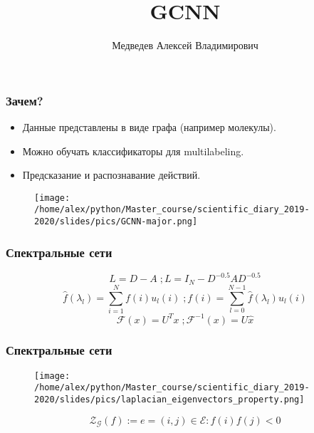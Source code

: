 \documentclass[fleqn, xcolor=x11names]{beamer}
\title{GCNN}
\author[Медведев~Д.\,В.]{Медведев Алексей Владимирович}
\institute[ВМК МГУ]{МГУ имени М. В. Ломоносова,
факультет ВМК, кафедра ММП}
\date{}
\begin{document}
\begin{frame}
\maketitle
\end{frame}

\begin{frame}[fragile]\frametitle{Зачем?}
\begin{block}{}
\begin{itemize}

\item Данные представлены в виде графа (например молекулы).

\item Можно обучать классификаторы для multilabeling.

\item Предсказание и распознавание действий.
\end{itemize}
\end{block}

\begin{figure}[h]
\begin{center}
\texttt{[image: /home/alex/python/Master\_course/scientific\_diary\_2019-2020/slides/pics/GCNN-major.png]}
\end{center}
\end{figure}

\end{frame}

\begin{frame}\frametitle{Спектральные сети}

$$L = D-A\;; L = I_N-D^{-0.5}AD^{-0.5}$$
$$\hat{f}(\lambda_l) = \sum \limits_{i=1}^{N} f(i)u_l(i)\;;f(i)= \sum \limits_{l=0}^{N-1} \hat{f}(\lambda_l)u_l(i)$$
$$\mathcal{F}(x)=U^Tx\;;\mathcal{F}^{-1}(x)=U\hat{x}$$

\end{frame}


\begin{frame}\frametitle{Спектральные сети}

\begin{figure}[h]
\begin{center}
\texttt{[image: /home/alex/python/Master\_course/scientific\_diary\_2019-2020/slides/pics/laplacian\_eigenvectors\_property.png]}
\end{center}
\end{figure}

$$ \mathcal{Z}_{\mathcal{G}}(f) := {e=(i,j)\in \mathcal{E}:f(i)f(j)<0} $$

\end{frame}
\end{document}
